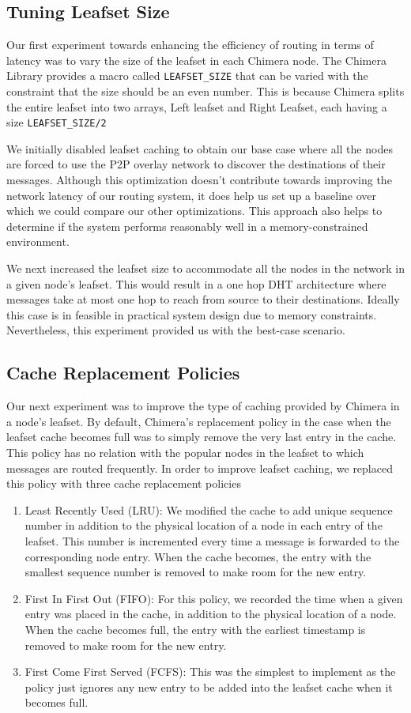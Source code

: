 \subsection{Tuning Leafset Size}
Our first experiment towards enhancing the efficiency of routing in terms of latency was to vary the size of the leafset in each Chimera node. The Chimera Library provides a macro called \texttt{LEAFSET\_SIZE} that can be varied with the constraint that the size should be an even number. This is because Chimera splits the entire leafset into two arrays, Left leafset and Right Leafset, each having a size \texttt{LEAFSET\_SIZE/2}
 
We initially disabled leafset caching to obtain our base case where all the nodes are forced to use the P2P overlay network to discover the destinations of their messages. Although this optimization doesn’t contribute towards improving the network latency of our routing system, it does help us set up a baseline over which we could compare our other optimizations. This approach also helps to determine if the system performs reasonably well in a memory-constrained environment.
 
We next increased the leafset size to accommodate all the nodes in the network in a given node’s leafset. This would result in a one hop DHT architecture where messages take at most one hop to reach from source to their destinations. Ideally this case is in feasible in practical system design due to memory constraints. Nevertheless, this experiment provided us with the best-case scenario.

\subsection{Cache Replacement Policies}
Our next experiment was to improve the type of caching provided by Chimera in a node’s leafset. By default, Chimera’s replacement policy in the case when the leafset cache becomes full was to simply remove the very last entry in the cache. This policy has no relation with the popular nodes in the leafset to which messages are routed frequently. In order to improve leafset caching, we replaced this policy with three cache replacement policies
\begin{enumerate}
\item Least Recently Used (LRU): We modified the cache to add unique sequence number in addition to the physical location of a node in each entry of the leafset. This number is incremented every time a message is forwarded to the corresponding node entry.  When the cache becomes, the entry with the smallest sequence number is removed to make room for the new entry.
 \item First In First Out (FIFO): For this policy, we recorded the time when a given entry was placed in the cache, in addition to the physical location of a node. When the cache becomes full, the entry with the earliest timestamp is removed to make room for the new entry.
 \item First Come First Served (FCFS): This was the simplest to implement as the policy just ignores any new entry to be added into the leafset cache when it becomes full.
 \end{enumerate}
 
